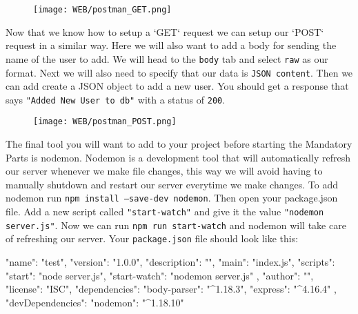 \documentclass{42-en}
\begin{document}
    \begin{figure}[H]
        \begin{center}
            \texttt{[image: WEB/postman\_GET.png]}
        \end{center}
    \end{figure}

Now that we know how to setup a `GET` request we can setup our `POST` request in a similar way. Here we will also want to add a body for sending the name of the user to add. We will head to the \texttt{body} tab and select \texttt{raw} as our format. Next we will also need to specify that our data is \texttt{JSON content}. Then we can add create a JSON object to add a new user. You should get a response that says \texttt{"Added New User to db"} with a status of \texttt{200}.

    \begin{figure}[H]
        \begin{center}
            \texttt{[image: WEB/postman\_POST.png]}
        \end{center}
    \end{figure}


The final tool you will want to add to your project before starting the Mandatory Parts is nodemon. Nodemon is a development tool that will automatically refresh our server whenever we make file changes, this way we will avoid having to manually shutdown and restart our server everytime we make changes. To add nodemon run \texttt{npm install --save-dev nodemon}. Then open your package.json file. Add a new script called \texttt{"start-watch"} and give it the value \texttt{"nodemon server.js"}. Now we can run \texttt{npm run start-watch} and nodemon will take care of refreshing our server. Your \texttt{package.json} file should look like this:
\begin{42jscode}
{
  "name": "test",
  "version": "1.0.0",
  "description": "",
  "main": "index.js",
  "scripts": {
    "start": "node server.js",
    "start-watch": "nodemon server.js"
  },
  "author": "",
  "license": "ISC",
  "dependencies": {
    "body-parser": "^1.18.3",
    "express": "^4.16.4"
  },
  "devDependencies": {
    "nodemon": "^1.18.10"
  }
}
\end{42jscode}


\newpage
\nextexercice
\end{document}
